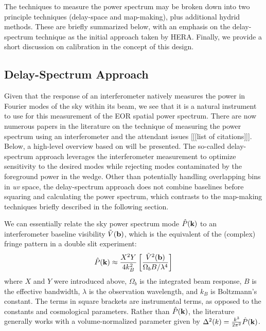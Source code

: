 \documentclass[preprint,11pt]{aastex}
\newcommand{\kvec}{{\bf k}}
\newcommand{\bvec}{{\bf b}}
\begin{document}
The techniques to measure the power spectrum may be broken down into two principle techniques (delay-space and map-making), plus additional hydrid methods.  These are briefly summarized below, with an emphasis on the delay-spectrum technique as the initial approach taken by HERA.  Finally, we provide a short discussion on calibration in the concept of this design.

\subsection{Delay-Spectrum Approach}
\label{sec:delayapproach}
Given that the response of an interferometer natively measures the power in Fourier modes of the sky within its beam, we see that it is a natural instrument to use for this measurement of the EOR spatial power spectrum.  There are now numerous papers in the literature on the technique of measuring the power spectrum using an interferometer and the attendant issues [[[list of citations]]].  Below, a high-level overview based on  \cite{parsons_et_al2012b} will be presented. The so-called delay-spectrum approach leverages the interferometer measurement to optimize sensitivity to the desired modes while rejecting modes contaminated by the foreground power in the wedge.  Other than potentially handling overlapping bins in {\em uv} space, the delay-spectrum approach does not combine baselines before squaring and calculating the power spectrum, which contrasts to the map-making techniques briefly described in the following section.

We can essentially relate the sky power spectrum mode ${\hat P}(\kvec)$ to an interferometer baseline visibility ${\tilde V}(\bvec)$, which is the equivalent of the (complex) fringe pattern in a double slit experiment:
\begin{equation}
{\hat P}(\kvec) \approx\frac{X^2Y}{4k_B^2}   \left[\frac{{\tilde V}^2(\bvec)}{\Omega_b B/ \lambda^4} \right]
\label{eq:Pk_baseline}
\end{equation}
where $X$ and $Y$ were introduced above, $\Omega_b$ is the integrated beam response, $B$ is the effective bandwidth, $\lambda$ is the observation wavelength, and $k_B$ is Boltzmann's constant.  The terms in square brackets are instrumental terms, as opposed to the constants and cosmological parameters.  
Rather than ${\hat P}(\kvec)$, the literature generally works with a volume-normalized parameter given by $\Delta^2(k) = \frac{k^3}{2\pi^2}{\hat P}(\kvec)$.    
\end{document}
